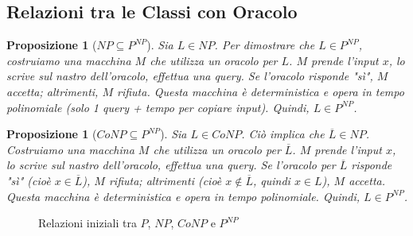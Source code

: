 \documentclass[a4paper, 11pt]{book} %
\newtheorem{proposition}[theorem]{Proposizione}
\theoremstyle{definition}
\begin{document}
\subsection{Relazioni tra le Classi con Oracolo}
\begin{proposition}[$NP \subseteq P^{NP}$]
Sia $L \in NP$. Per dimostrare che $L \in P^{NP}$, costruiamo una macchina $M$ che utilizza un oracolo per $L$. $M$ prende l'input $x$, lo scrive sul nastro dell'oracolo, effettua una query. Se l'oracolo risponde "sì", $M$ accetta; altrimenti, $M$ rifiuta. Questa macchina è deterministica e opera in tempo polinomiale (solo 1 query + tempo per copiare input). Quindi, $L \in P^{NP}$.
\end{proposition}

\begin{proposition}[$CoNP \subseteq P^{NP}$]
Sia $L \in CoNP$. Ciò implica che $\overline{L} \in NP$. Costruiamo una macchina $M$ che utilizza un oracolo per $\overline{L}$. $M$ prende l'input $x$, lo scrive sul nastro dell'oracolo, effettua una query. Se l'oracolo per $\overline{L}$ risponde "sì" (cioè $x \in \overline{L}$), $M$ rifiuta; altrimenti (cioè $x \notin \overline{L}$, quindi $x \in L$), $M$ accetta. Questa macchina è deterministica e opera in tempo polinomiale. Quindi, $L \in P^{NP}$.
\end{proposition}

\begin{figure}[h]
    \centering
    \caption{Relazioni iniziali tra $P$, $NP$, $CoNP$ e $P^{NP}$}
\end{figure}
\end{document}
